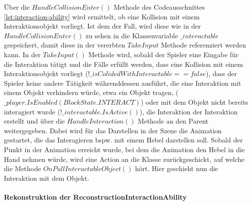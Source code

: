 Über die $HandleCollisionEnter()$ Methode des Codeausschnittes \ref{lst:interaction-ability} wird ermittelt, ob eine Kollision mit einem Interaktionsobjekt vorliegt. Ist dem der Fall, wird diese wie in der $HandleCollisionEnter()$ zu sehen in die Klassenvariable $\_interactable$ gespeichert, damit diese in der vererbten $TakeInput$ Methode referenziert werden kann. In der $TakeInput()$ Methode wird, sobald der Spieler eine Eingabe für die Interaktion tätigt und die Fälle erfüllt werden, dass eine Kollision mit einem Interaktionsobjekt vorliegt ($!\_isColidedWithInteractable == false$), dass der Spieler keine andere Tätigkeit währenddessen ausführt, die eine Interaktion mit einem Objekt verhindern würde, etwa ein Objekt tragen, ($\_player.IsEnabled(BlockState.INTERACT)$) oder mit dem Objekt nicht bereits interagiert wurde ($!\_interactable.IsActive()$), die Interaktion der Interaktion erstellt und über die $HandleInteraction()$ Methode an den Parent weitergegeben. Dabei wird für das Darstellen in der Szene die Animation gestartet, die das Interagieren bspw. mit einem Hebel darstellen soll. Sobald der Punkt in der Animation erreicht wurde, bei dem die Animation den Hebel in die Hand nehmen würde, wird eine Action an die Klasse zurückgeschickt, auf welche die  Methode $OnPullInteractableObject()$ hört. Hier geschieht nun die Interaktion mit dem Objekt.

\paragraph{Rekonstruktion der ReconstructionInteractionAbility}
~

